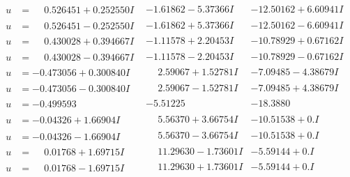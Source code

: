 \documentclass[1p]{elsarticle_modified}
\theoremstyle{definition}
\begin{document}
$$\begin{array}{c|c|c}
\begin{aligned}
u &= \phantom{-}0.526451 + 0.252550 I\end{aligned}
 & -1.61862 - 5.37366 I & -12.50162 + 6.60941 I \\ \hline\begin{aligned}
u &= \phantom{-}0.526451 - 0.252550 I\end{aligned}
 & -1.61862 + 5.37366 I & -12.50162 - 6.60941 I \\ \hline\begin{aligned}
u &= \phantom{-}0.430028 + 0.394667 I\end{aligned}
 & -1.11578 + 2.20453 I & -10.78929 + 0.67162 I \\ \hline\begin{aligned}
u &= \phantom{-}0.430028 - 0.394667 I\end{aligned}
 & -1.11578 - 2.20453 I & -10.78929 - 0.67162 I \\ \hline\begin{aligned}
u &= -0.473056 + 0.300840 I\end{aligned}
 & \phantom{-}2.59067 + 1.52781 I & -7.09485 - 4.38679 I \\ \hline\begin{aligned}
u &= -0.473056 - 0.300840 I\end{aligned}
 & \phantom{-}2.59067 - 1.52781 I & -7.09485 + 4.38679 I \\ \hline\begin{aligned}
u &= -0.499593\phantom{ +0.000000I}\end{aligned}
 & -5.51225\phantom{ +0.000000I} & -18.3880\phantom{ +0.000000I} \\ \hline\begin{aligned}
u &= -0.04326 + 1.66904 I\end{aligned}
 & \phantom{-}5.56370 + 3.66754 I & -10.51538 + 0. I\phantom{ +0.000000I} \\ \hline\begin{aligned}
u &= -0.04326 - 1.66904 I\end{aligned}
 & \phantom{-}5.56370 - 3.66754 I & -10.51538 + 0. I\phantom{ +0.000000I} \\ \hline\begin{aligned}
u &= \phantom{-}0.01768 + 1.69715 I\end{aligned}
 & \phantom{-}11.29630 - 1.73601 I & -5.59144 + 0. I\phantom{ +0.000000I} \\ \hline\begin{aligned}
u &= \phantom{-}0.01768 - 1.69715 I\end{aligned}
 & \phantom{-}11.29630 + 1.73601 I & -5.59144 + 0. I\phantom{ +0.000000I} \\ \hline\begin{aligned}

\end{aligned}
\end{array}$$
\end{document}
